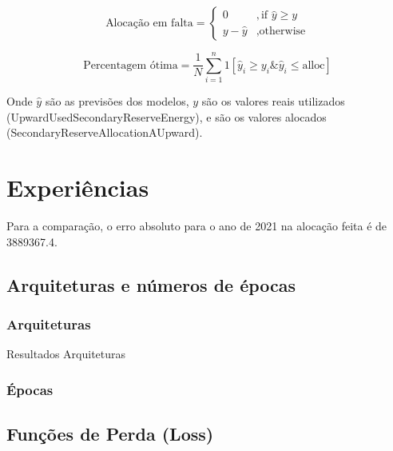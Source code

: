 \begin{equation} 
    \label{eq:miss_alloc} 
    \text{Alocação em falta} = 
    \begin{cases} 
        0 & ,\text{if } \hat{y} \geq y \\
        y - \hat{y} & ,\text{otherwise} 
    \end{cases} 
\end{equation}

\begin{equation} 
    \label{eq:opt_perc} 
    \text{Percentagem ótima} = \frac{1}{N} \sum_{i=1}^{n} 1 [\hat{y}_i \geq y_i  \&  \hat{y}_i \leq \text{alloc}]
\end{equation}

Onde $\hat{y}$ são as previsões dos modelos, $y$ são os valores reais utilizados (UpwardUsedSecondaryReserveEnergy), e  são os valores alocados (SecondaryReserveAllocationAUpward). \\

\section{Experiências\label{se:experiments}}

Para a comparação, o erro absoluto para o ano de 2021 na alocação feita é de 3889367.4. \\

\subsection{Arquiteturas e números de épocas\label{se:archs_epocs}}

\subsubsection{Arquiteturas\label{se:archs_res}}

\begin{table}[H]
\caption{Resultados Arquiteturas}            
\end{table}

\subsubsection{Épocas\label{se:epocas_res}}

\subsection{Funções de Perda (Loss) \label{se:loss_exp}}

